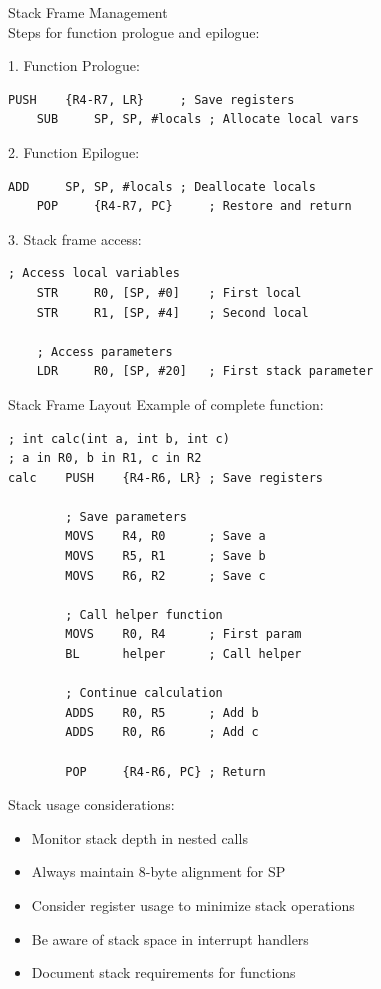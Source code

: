 \begin{KR}{Stack Frame Management}\\
Steps for function prologue and epilogue:

1. Function Prologue:
\begin{lstlisting}[language=armasm, style=basesmol]
    PUSH    {R4-R7, LR}     ; Save registers
    SUB     SP, SP, #locals ; Allocate local vars
\end{lstlisting}

2. Function Epilogue:
\begin{lstlisting}[language=armasm, style=basesmol]
    ADD     SP, SP, #locals ; Deallocate locals
    POP     {R4-R7, PC}     ; Restore and return
\end{lstlisting}

3. Stack frame access:
\begin{lstlisting}[language=armasm, style=basesmol]
    ; Access local variables
    STR     R0, [SP, #0]    ; First local
    STR     R1, [SP, #4]    ; Second local
    
    ; Access parameters
    LDR     R0, [SP, #20]   ; First stack parameter
\end{lstlisting}
\end{KR}

\begin{example2}{Stack Frame Layout}
Example of complete function:
\begin{lstlisting}[language=armasm, style=basesmol]
; int calc(int a, int b, int c)
; a in R0, b in R1, c in R2
calc    PUSH    {R4-R6, LR} ; Save registers
        
        ; Save parameters
        MOVS    R4, R0      ; Save a
        MOVS    R5, R1      ; Save b
        MOVS    R6, R2      ; Save c
        
        ; Call helper function
        MOVS    R0, R4      ; First param
        BL      helper      ; Call helper
        
        ; Continue calculation
        ADDS    R0, R5      ; Add b
        ADDS    R0, R6      ; Add c
        
        POP     {R4-R6, PC} ; Return
\end{lstlisting}
\end{example2}

\begin{remark}
Stack usage considerations:
\begin{itemize}
  \item Monitor stack depth in nested calls
  \item Always maintain 8-byte alignment for SP
  \item Consider register usage to minimize stack operations
  \item Be aware of stack space in interrupt handlers
  \item Document stack requirements for functions
\end{itemize}
\end{remark}

